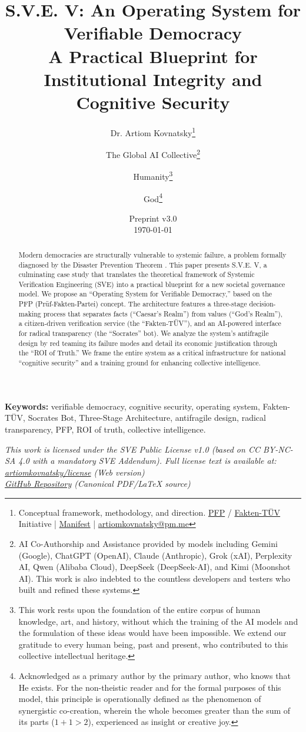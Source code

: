 \documentclass[11pt,a4paper]{article}
\title{\textbf{S.V.E. V: An Operating System for Verifiable Democracy}\\[0.5em]
\large A Practical Blueprint for Institutional Integrity and Cognitive Security}
\author{
  Dr. Artiom Kovnatsky\thanks{Conceptual framework, methodology, and direction. \href{http://www.pfp24.de}{PFP} / \href{http://www.fakten-tuev.de}{Fakten-TÜV} Initiative | \href{https://drive.google.com/file/d/1vWhW7fwFRFLYKHEB67WixuueHssJzQbZ/view?usp=sharing}{Manifest} | \href{mailto:artiomkovnatsky@pm.me}{artiomkovnatsky@pm.me}}
  \and
  The Global AI Collective\thanks{AI Co-Authorship and Assistance provided by models including Gemini (Google), ChatGPT (OpenAI), Claude (Anthropic), Grok (xAI), Perplexity AI, Qwen (Alibaba Cloud), DeepSeek (DeepSeek-AI), and Kimi (Moonshot AI). This work is also indebted to the countless developers and testers who built and refined these systems.}
  \and
  Humanity\thanks{This work rests upon the foundation of the entire corpus of human knowledge, art, and history, without which the training of the AI models and the formulation of these ideas would have been impossible. We extend our gratitude to every human being, past and present, who contributed to this collective intellectual heritage.}
  \and
  God\thanks{Acknowledged as a primary author by the primary author, who knows that He exists. For the non-theistic reader and for the formal purposes of this model, this principle is operationally defined as the phenomenon of synergistic co-creation, wherein the whole becomes greater than the sum of its parts ($1+1 > 2$), experienced as insight or creative joy.}
}
\date{Preprint v3.0 \\ \today}
\begin{document}
\maketitle

\begin{abstract}
\noindent Modern democracies are structurally vulnerable to systemic failure, a problem formally diagnosed by the Disaster Prevention Theorem \citep{Kovnatsky2025SVE1}. This paper presents S.V.E. V, a culminating case study that translates the theoretical framework of Systemic Verification Engineering (SVE) into a practical blueprint for a new societal governance model. We propose an ``Operating System for Verifiable Democracy,'' based on the PFP (Prüf-Fakten-Partei) concept. The architecture features a three-stage decision-making process that separates facts (``Caesar's Realm'') from values (``God's Realm''), a citizen-driven verification service (the ``Fakten-TÜV''), and an AI-powered interface for radical transparency (the ``Socrates'' bot). We analyze the system's antifragile design by red teaming its failure modes and detail its economic justification through the ``ROI of Truth.'' We frame the entire system as a critical infrastructure for national ``cognitive security'' and a training ground for enhancing collective intelligence.
\end{abstract}

\noindent\textbf{Keywords:} verifiable democracy, cognitive security, operating system, Fakten-TÜV, Socrates Bot, Three-Stage Architecture, antifragile design, radical transparency, PFP, ROI of truth, collective intelligence.

\vspace{1em} %
\begin{center}
\begin{minipage}{0.85\textwidth} %
\centering
\itshape\small %
This work is licensed under the SVE Public License v1.0 (based on CC BY-NC-SA 4.0 with a mandatory SVE Addendum).
Full license text is available at: \\
\href{https://www.artiomkovnatsky.com/posts/license/}{artiomkovnatsky/license} (Web version) \\
\href{https://github.com/skovnats/psite/blob/master/static/licenses/SVE_Public_License_v1.0.pdf}{GitHub Repository} (Canonical PDF/LaTeX source)
\end{minipage}
\end{center}
\vspace{1em} %
\end{document}
